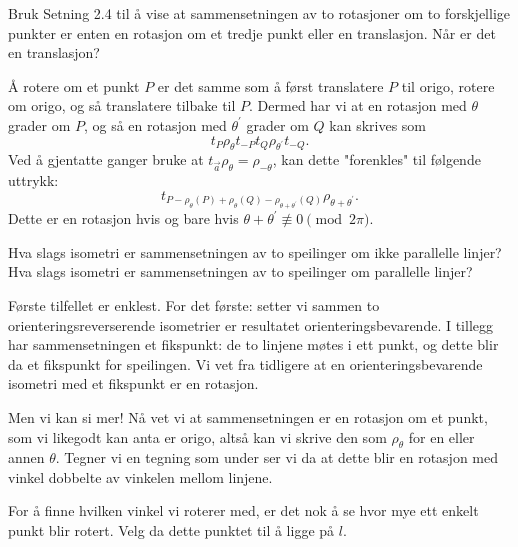 \documentclass[11pt, norsk]{article}
\begin{document}
\begin{oppg}
Bruk Setning 2.4 til å vise at sammensetningen av to rotasjoner om to forskjellige punkter er enten en rotasjon om et tredje punkt eller en translasjon. Når er det en translasjon?  
\end{oppg}
\begin{losn}
Å rotere om et punkt $P$ er det samme som å først translatere $P$ til origo, rotere om origo, og så translatere tilbake til $P$. Dermed har vi at en rotasjon med $\theta$ grader om $P$, og så en rotasjon med $\theta^\prime$ grader om $Q$ kan skrives som
$$
t_P \rho_\theta t_{-P} t_Q \rho_{\theta^\prime} t_{-Q}.
$$
Ved å  gjentatte ganger bruke at $t_{\vec a} \rho_{\theta} = \rho_{-\theta}$, kan dette "forenkles" til følgende uttrykk: 
$$
t_{P-\rho_\theta(P)+\rho_\theta(Q)-\rho_{\theta+\theta^\prime}(Q)} \rho_{\theta+\theta^\prime}.
$$
Dette er en rotasjon hvis og bare hvis $\theta+\theta^\prime \not \equiv 0 \pmod {2\pi}$.
\end{losn}


\begin{oppg}
Hva slags isometri er sammensetningen av to speilinger om ikke parallelle linjer? Hva slags isometri er sammensetningen av to speilinger om parallelle linjer?
\end{oppg}

\begin{losn}
Første tilfellet er enklest. For det første: setter vi sammen to orienteringsreverserende isometrier er resultatet orienteringsbevarende. I tillegg har sammensetningen et fikspunkt: de to linjene møtes i ett punkt, og dette blir da et fikspunkt for speilingen. Vi vet fra tidligere at en orienteringsbevarende isometri med et fikspunkt er en rotasjon.

Men vi kan si mer! Nå vet vi at sammensetningen er en rotasjon om et punkt, som vi likegodt kan anta er origo, altså kan vi skrive den som $\rho_\theta$ for en eller annen $\theta$. Tegner vi en tegning som under ser vi da at dette blir en rotasjon med vinkel dobbelte av vinkelen mellom linjene.
\begin{figure}[h]
\begin{center}
\end{center}
\end{figure}
For å finne hvilken vinkel vi roterer med, er det nok å se hvor mye ett enkelt punkt blir rotert. Velg da dette punktet til å ligge på $l$. 
\end{losn}
\end{document}
